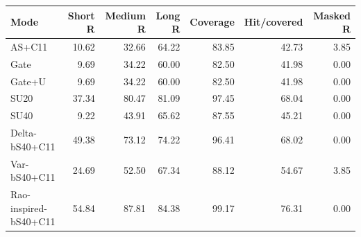 \setlength{\tabcolsep}{3pt}\begin{tabular}{lrrrrrr}\toprule
Mode & Short R & Medium R & Long R & Coverage & Hit/covered & Masked R \\\midrule
AS+C11 & 10.62 & 32.66 & 64.22 & 83.85 & 42.73 & 3.85 \\
Gate & 9.69 & 34.22 & 60.00 & 82.50 & 41.98 & 0.00 \\
Gate+U & 9.69 & 34.22 & 60.00 & 82.50 & 41.98 & 0.00 \\
SU20 & 37.34 & 80.47 & 81.09 & 97.45 & 68.04 & 0.00 \\
SU40 & 9.22 & 43.91 & 65.62 & 87.55 & 45.21 & 0.00 \\
Delta-bS40+C11 & 49.38 & 73.12 & 74.22 & 96.41 & 68.02 & 0.00 \\
Var-bS40+C11 & 24.69 & 52.50 & 67.34 & 88.12 & 54.67 & 3.85 \\
Rao-inspired-bS40+C11 & 54.84 & 87.81 & 84.38 & 99.17 & 76.31 & 0.00 \\
\bottomrule\end{tabular}
